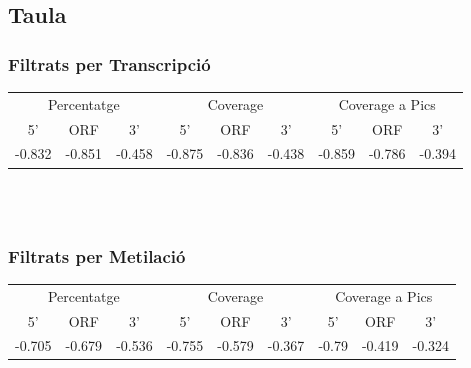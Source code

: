 \documentclass{article}\usepackage[]{graphicx}\usepackage[]{color}
\newenvironment{knitrout}{}{} %
\begin{document}
\begin{knitrout}
{}



\end{knitrout}
\clearpage



\subsection{Taula}
\subsubsection{Filtrats per Transcripció}
\begin{tabular}{ccc|ccc|ccc}
\hline
\multicolumn{3}{c}{Percentatge} &
\multicolumn{3}{c}{Coverage} &
\multicolumn{3}{c}{Coverage a Pics} \\
\cline{1-3}
\cline{4-6}
\cline{7-9}
5' & ORF & 3' & 5' & ORF & 3' & 5' & ORF & 3' \\
\hline
-0.832 & -0.851 & -0.458 &
-0.875 & -0.836 & -0.438 &
-0.859 & -0.786 & -0.394\\
\hline
\end{tabular} \\\\

\subsubsection{Filtrats per Metilació}
\begin{tabular}{ccc|ccc|ccc}
\hline
\multicolumn{3}{c}{Percentatge} &
\multicolumn{3}{c}{Coverage} &
\multicolumn{3}{c}{Coverage a Pics} \\
\cline{1-3}
\cline{4-6}
\cline{7-9}
5' & ORF & 3' & 5' & ORF & 3' & 5' & ORF & 3' \\
\hline
-0.705 & -0.679 & -0.536 &
-0.755 & -0.579 & -0.367 &
-0.79 & -0.419 & -0.324\\
\hline
\end{tabular} \\\\
\end{document}
